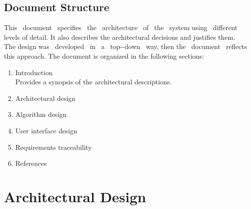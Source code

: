 \documentclass[a4paper,11pt]{report} %
\begin{document}
	\subsection{Document Structure} This  document  specifies  the  architecture  of  the  system  using  different levels of detail. It also describes the architectural decisions and justifies them. The design was  developed  in  a  top-­‐down  way, then the  document  reflects this approach.
	The document is organized in the following sections:
	\begin{enumerate}
		\item Introduction\\
		Provides a synopsis of the architectural descriptions.
		\item Architectural design
		\item Algorithm design
		\item User interface design
		\item Requirements traceability
		\item References
		
	\end{enumerate} 
	
	\section{Architectural Design}
	
\end{document}
